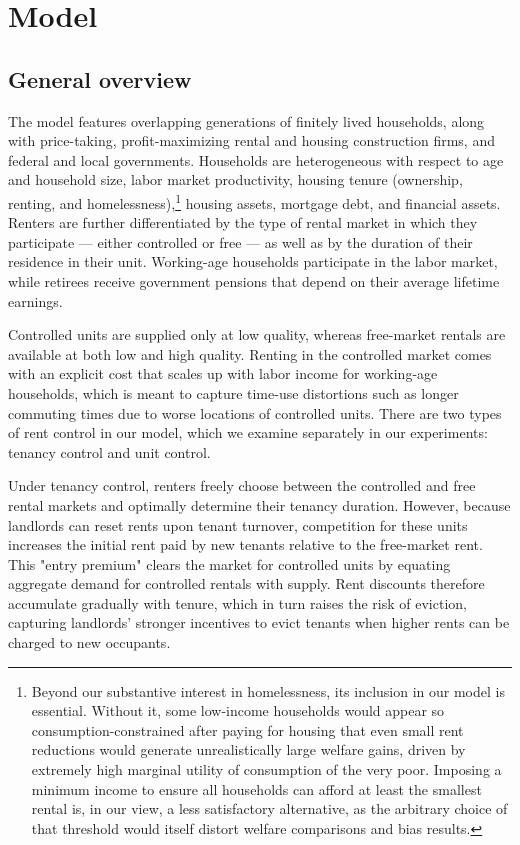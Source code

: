 \documentclass[parskip=full]{article}
\begin{document}
\section{Model}\label{sec:model}

\subsection{General overview}\label{sec:brief_overview}

The model features overlapping generations of finitely lived households, along with price-taking, profit-maximizing rental and housing construction firms, and federal and local governments. Households are heterogeneous with respect to age and household size, labor market productivity, housing tenure (ownership, renting, and homelessness),\footnote{Beyond our substantive interest in homelessness, its inclusion in our model is essential. Without it, some low-income households would appear so consumption-constrained after paying for housing that even small rent reductions would generate unrealistically large welfare gains, driven by extremely high marginal utility of consumption of the very poor. Imposing a minimum income to ensure all households can afford at least the smallest rental is, in our view, a less satisfactory alternative, as the arbitrary choice of that threshold would itself distort welfare comparisons and bias results.} housing assets, mortgage debt, and financial assets. Renters are further differentiated by the type of rental market in which they participate — either controlled or free — as well as by the duration of their residence in their unit. Working-age households participate in the labor market, while retirees receive government pensions that depend on their average lifetime earnings.

Controlled units are supplied only at low quality, whereas free-market rentals are available at both low and high quality. Renting in the controlled market comes with an explicit cost that scales up with labor income for working-age households, which is meant to capture time-use distortions such as longer commuting times due to worse locations of controlled units. There are two types of rent control in our model, which we examine separately in our experiments: tenancy control and unit control.

Under tenancy control, renters freely choose between the controlled and free rental markets and optimally determine their tenancy duration. However, because landlords can reset rents upon tenant turnover, competition for these units increases the initial rent paid by new tenants relative to the free-market rent. This "entry premium" clears the market for controlled units by equating aggregate demand for controlled rentals with supply. Rent discounts therefore accumulate gradually with tenure, which in turn raises the risk of eviction, capturing landlords’ stronger incentives to evict tenants when higher rents can be charged to new occupants.
\end{document}
